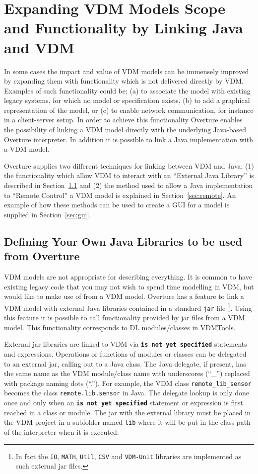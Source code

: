 \documentclass{overturerepchap}
\begin{document}
\chapter{Expanding VDM Models Scope and Functionality by Linking Java and VDM} \label{sec:linkToJava}

In some cases the impact and value of VDM models can be immensely
improved by expanding them with functionality which is not delivered
directly by VDM. Examples of such functionality could be; (a) to
associate the model with existing legacy systems, for which no model
or specification exists, (b) to add a graphical representation of the
model, or (c) to enable network communication, for instance in a
client-server setup.  In order to achieve this functionality Overture
enables the possibility of linking a VDM model directly with the
underlying Java-based Overture interpreter. In addition it is possible
to link a
Java implementation with a VDM model.

Overture supplies two different techniques for linking between VDM and Java; (1) the functionality which allow VDM to interact with an ``External Java Library'' is described in Section~\ref{sec:javalibs} and (2) the method used to allow a Java implementation to ``Remote Control'' a VDM model is explained in Section~\ref{sec:remote}. An example of how these methods can be used to create a GUI for a model is supplied in Section~\ref{sec:gui}.

\section{Defining Your Own Java Libraries to be used from Overture}\label{sec:javalibs}

VDM models are not appropriate for describing everything. It is common
to have existing legacy code that you may not
wish to spend time modelling in VDM, but would like to make use of
from a VDM model. Overture has a feature to link a VDM
model with external Java libraries contained in a standard \texttt{jar} file
\footnote{In fact the \texttt{IO}, \texttt{MATH}, \texttt{Util},
  \texttt{CSV} and \texttt{VDM-Unit} libraries are implemented as such
external jar files.}.
Using this feature it is possible
to call functionality provided by jar files from a VDM model. This functionality
corresponds to DL modules/classes in VDMTools\cite{DLMan}.

External jar libraries are linked to VDM via
{\textbf\texttt{is not yet specified}} statements and expressions. Operations
or functions of modules or classes can be delegated to an external
jar, calling out to a Java class. The Java delegate, if present, has
the same name as the VDM
module/class name with underscores (``\_'') replaced with package naming
dots (``.''). For example, the VDM class \texttt{remote\_lib\_sensor} becomes
the class \texttt{remote.lib.sensor} in Java. The delegate lookup is only done once and
only when an  {\textbf\texttt{is not yet specified}} statement or expression is first
reached in a class or module. The jar with the external library must be placed in
the VDM project in a subfolder named \texttt{lib} where it will be put in the
class-path of the interpreter when it is executed.
\end{document}
